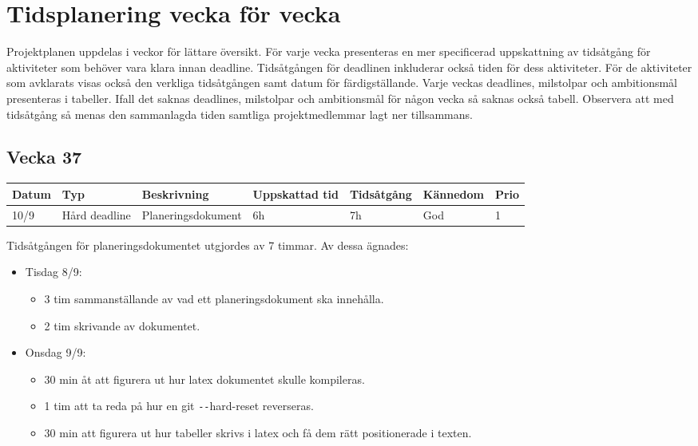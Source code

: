 \documentclass{TDP003mall}
\begin{document}
\section{Tidsplanering vecka för vecka}
Projektplanen uppdelas i veckor för lättare översikt. För varje vecka presenteras
 en mer specificerad uppskattning av tidsåtgång för aktiviteter som behöver vara
 klara innan deadline. Tidsåtgången för deadlinen inkluderar också tiden för dess
 aktiviteter. För de aktiviteter som avklarats visas också den verkliga tidsåtgången
 samt datum för färdigställande. Varje veckas deadlines, milstolpar och ambitionsmål presenteras
 i tabeller. Ifall det saknas deadlines, milstolpar och ambitionsmål för någon vecka så saknas också tabell. Observera att med tidsåtgång så menas den sammanlagda tiden samtliga projektmedlemmar lagt ner tillsammans.

\subsection{Vecka 37}
\begin{tabularx}{\linewidth}{|l|l|X|l|l|l|l|}
	\hline
	Datum & Typ           & Beskrivning        & Uppskattad tid & Tidsåtgång & Kännedom & Prio \\ [0.5ex]
	\hline                                             
	10/9  & Hård deadline & Planeringsdokument & 6h             & 7h         & God      & 1    \\
	\hline
\end{tabularx}

Tidsåtgången för planeringsdokumentet utgjordes av 7 timmar. Av dessa ägnades:
\begin{itemize}
	\item Tisdag 8/9:
	\begin{itemize}
		\item 3 tim sammanställande av vad ett planeringsdokument ska innehålla.
		\item 2 tim skrivande av dokumentet.
	\end{itemize}
	\item Onsdag 9/9:
	\begin{itemize}
		\item 30 min åt att figurera ut hur latex dokumentet skulle kompileras.
		\item 1 tim att ta reda på hur en git \texttt{-{}-}hard-reset reverseras.
		\item 30 min att figurera ut hur tabeller skrivs i latex och få dem rätt positionerade i texten.\\
	\end{itemize}

      \end{itemize}
\end{document}
